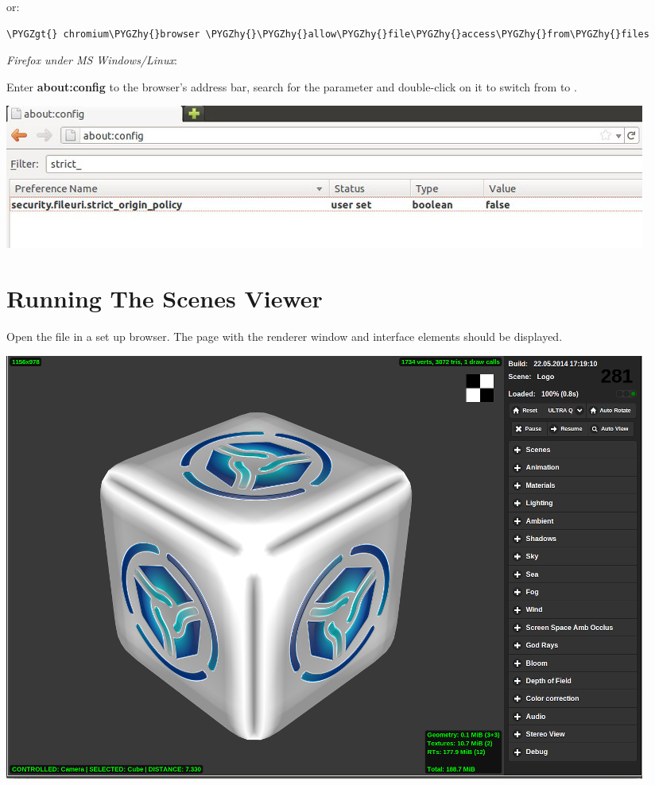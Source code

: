 \documentclass[a4paper,12pt,oneside]{sphinxmanual}
\def\PYGZgt{\char`\>}
\def\PYGZhy{\char`\-}
\begin{document}
or:

\begin{Verbatim}[commandchars=\\\{\}]
\PYGZgt{} chromium\PYGZhy{}browser \PYGZhy{}\PYGZhy{}allow\PYGZhy{}file\PYGZhy{}access\PYGZhy{}from\PYGZhy{}files
\end{Verbatim}

\emph{Firefox under MS Windows/Linux}:

Enter \textbf{about:config} to the browser's address bar, search for the  parameter and double-click on it to switch from  to .

\begin{DUlineblock}{0em}
\item[] 
\end{DUlineblock}

{\hfill\includegraphics[width=1.000\linewidth]{firefox_strict_origin.jpg}\hfill}

\begin{DUlineblock}{0em}
\item[] 
\end{DUlineblock}


\section{Running The Scenes Viewer}
\label{setup:id6}\label{setup:getting-started-launching-viewer}\label{setup:index-1}
Open the  file in a set up browser. The page with the renderer window and interface elements should be displayed.

{\hfill\includegraphics[width=1.000\linewidth]{default_page.jpg}\hfill}
\end{document}
